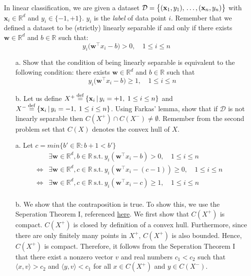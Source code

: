 \documentclass[11pt]{article}
\theoremstyle{remark}
\newcommand{\R}{\mathbb{R}}                     %
\newcommand{\eqdef}{\mathbin{\stackrel{\rm def}{=}}}
\newcommand{\bx}{\mathbf{x}}
\newcommand{\bw}{\mathbf{w}}
\begin{document}
In linear classification, we are given a dataset $\mathcal{D} = \big\{(\bx_1,
y_1),\newline\dots, (\bx_n, y_n)\big\}$ with $\bx_i\in\R^d$ and
$y_i\in\{-1,+1\}$. $y_i$ is the \emph{label} of data point $i$. Remember that
we defined a dataset to be (strictly) linearly separable if and only if there
exists $\bw\in\R^d$ and $b\in\R$ such that:
\begin{displaymath}
    y_i\big(\bw^\intercal x_i - b) > 0,\quad 1\leq i\leq n
\end{displaymath}
\begin{itemize}
    \item[a.] Show that the condition of being linearly separable is equivalent
        to the following condition: there exists $\bw\in\R^d$ and $b\in\R$ such
        that
        \begin{displaymath}
            y_i\big(\bw^\intercal x_i - b)\geq 1,\quad 1\leq i\leq n 
        \end{displaymath}
    \item[b.] Let us define $X^+ \eqdef \{\bx_i\,|\, y_i = +1,\; 1\leq i\leq n\}$
        and $X^- \eqdef \{\bx_i\,|\, y_i = -1,\; 1\leq i\leq n\}$. Using Farkas'
        lemma, show that if $\mathcal{D}$ is not linearly separable then
        $C(X^+)\cap C(X^-) \neq\emptyset$. Remember from the second problem set
        that $C(X)$ denotes the convex hull of $X$.
\end{itemize}

\color{blue}
\begin{itemize}
\item[a.]
Let $c=min\{b' \in \R: b+1 < b'\}$
\begin{align*}
& \exists \bw \in \R^d, b \in \R \ \text{s.t.} \ y_i (\bw^\intercal x_i - b)> 0,\quad 1\leq i\leq n &\\
\Leftrightarrow & \exists \bw \in \R^d, c \in \R \ \text{s.t.} \ y_i (\bw^\intercal x_i - (c-1)) \geq 0,\quad 1\leq i\leq n &\\
\Leftrightarrow & \exists \bw \in \R^d, c \in \R \ \text{s.t.} \ y_i (\bw^\intercal x_i - c) \geq 1,\quad 1\leq i\leq n &\\
\end{align*}

\item[b.]
We show that the contraposition is true.
To show this, we use the Seperation Theorem I, referenced \href{https://en.wikipedia.org/wiki/Hyperplane_separation_theorem}{here}. We first show that $C(X^+)$ is compact. $C(X^+)$ is closed by definition of a convex hull. Furthermore, since there are only finitely many points in $X^+$, $C(X^+)$ is also bounded. Hence, $C(X^+)$ is compact. Therefore, it follows from the Seperation Theorem I that there exist a nonzero vector $v$ and real numbers $c_1 < c_2$ such that $\langle x,v \rangle > c_2$ and $\langle y,v \rangle< c_1$ for all $x \in C(X^+)$ and $y \in C(X^-)$.
\end{itemize}
\color{black}
\end{document}
